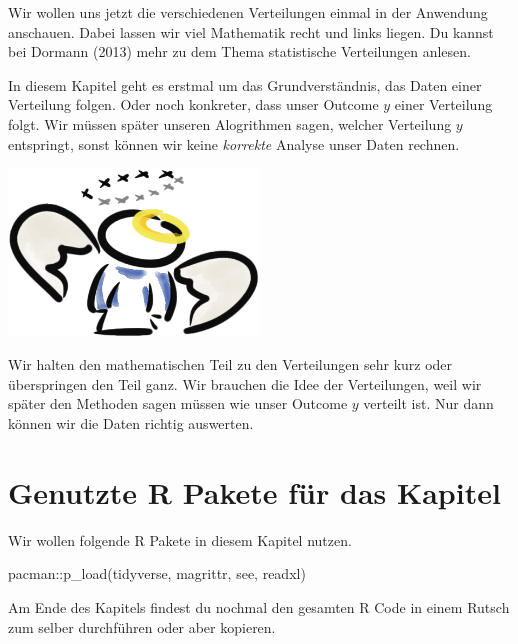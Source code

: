 \documentclass[
  letterpaper,
]{scrbook}
\newenvironment{Shaded}{\begin{snugshade}}{\end{snugshade}}
\newcommand{\FunctionTok}[1]{\textcolor[rgb]{0.28,0.35,0.67}{#1}}
\newcommand{\NormalTok}[1]{\textcolor[rgb]{0.00,0.23,0.31}{#1}}
\newcommand{\SpecialCharTok}[1]{\textcolor[rgb]{0.37,0.37,0.37}{#1}}
\begin{document}
Wir wollen uns jetzt die verschiedenen Verteilungen einmal in der
Anwendung anschauen. Dabei lassen wir viel Mathematik recht und links
liegen. Du kannst bei Dormann (2013) mehr zu dem Thema statistische
Verteilungen anlesen.

In diesem Kapitel geht es erstmal um das Grundverständnis, das Daten
einer Verteilung folgen. Oder noch konkreter, dass unser Outcome \(y\)
einer Verteilung folgt. Wir müssen später unseren Alogrithmen sagen,
welcher Verteilung \(y\) entspringt, sonst können wir keine
\emph{korrekte} Analyse unser Daten rechnen.

\begin{marginfigure}

{\centering \includegraphics[width=0.5\textwidth,height=\textheight]{./images/angel_01.png}

}

\end{marginfigure}

Wir halten den mathematischen Teil zu den Verteilungen sehr kurz oder
überspringen den Teil ganz. Wir brauchen die Idee der Verteilungen, weil
wir später den Methoden sagen müssen wie unser Outcome \(y\) verteilt
ist. Nur dann können wir die Daten richtig auswerten.

\hypertarget{genutzte-r-pakete-fuxfcr-das-kapitel-4}{%
\section{Genutzte R Pakete für das
Kapitel}\label{genutzte-r-pakete-fuxfcr-das-kapitel-4}}

Wir wollen folgende R Pakete in diesem Kapitel nutzen.

\begin{Shaded}
\begin{Highlighting}[]
\NormalTok{pacman}\SpecialCharTok{::}\FunctionTok{p\_load}\NormalTok{(tidyverse, magrittr, see, readxl)}
\end{Highlighting}
\end{Shaded}

Am Ende des Kapitels findest du nochmal den gesamten R Code in einem
Rutsch zum selber durchführen oder aber kopieren.
\end{document}
